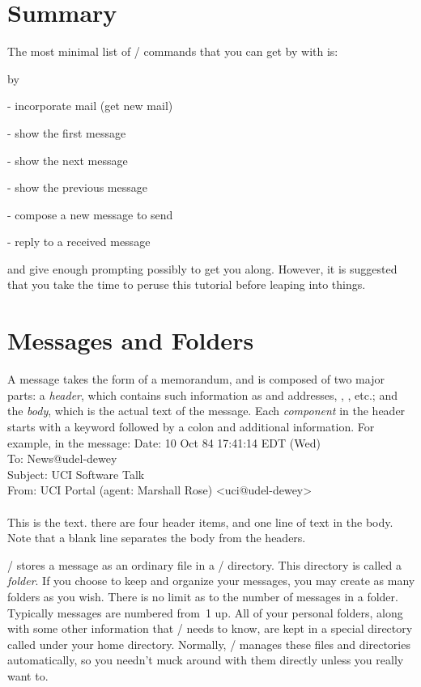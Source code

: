 \section{Summary}
The most minimal list of \MH/ commands that you can get by with is:
\smallskip
{\advance\leftskip by\parindent
\item{}	- incorporate mail (get new mail)
\item{}	- show the first message
\item{}	- show the next message
\item{}	- show the previous message
\item{}	- compose a new message to send
\item{}	- reply to a received message
\smallskip}
 and  give enough prompting possibly to get you along.
However, it is suggested that you take the time to peruse this
tutorial before leaping into things.

\section{Messages and Folders}
A message takes the form of a memorandum,
and is composed of two major parts:
a {\it header},
which contains such information as
 and  addresses, , , etc.;
and the {\it body},
which is the actual text of the message.
Each {\it component} in the header starts with a keyword followed by
a colon and additional information.
For example, in the message:
\example
    Date: 10 Oct 84 17:41:14 EDT (Wed)\\
    To: News@udel-dewey\\
    Subject: UCI Software Talk\\
    From: UCI Portal (agent: Marshall Rose) <uci@udel-dewey>\\\\
    This is the text.
\endexample
there are four header items, and one line of text in the body.
Note that a blank line separates the body from the headers.

\MH/ stores a message as an ordinary file in a \unix/ directory.
This directory is called a {\it folder}.
If you choose to keep and organize your messages,
you may create as many folders as you wish.
There is no limit as to the number of messages in a folder.
Typically messages are numbered from~1 up.
All of your personal folders,
along with some other information that \MH/ needs to know,
are kept in a special directory called  under your home directory.
Normally, \MH/ manages these files and directories automatically,
so you needn't muck around with them directly unless you really want to.

